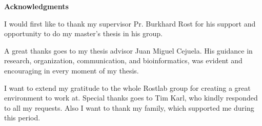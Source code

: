 \clearemptydoublepage
{}
{}



\vspace*{2cm}

\begin{center}
{\Large \bf Acknowledgments}
\end{center}

\vspace{1cm}




I would first like to thank my supervisor Pr. Burkhard Rost for his support and opportunity to do my master's thesis in his group.

A great thanks goes to my thesis advisor Juan Miguel Cejuela. His guidance in research, organization, communication, and bioinformatics, was evident and encouraging in every moment of my thesis.

I want to extend my gratitude to the whole Rostlab group for creating a great environment to work at. Special thanks goes to Tim Karl, who kindly responded to all my requests.
 Also I want to thank my family, which supported me during this period. 
